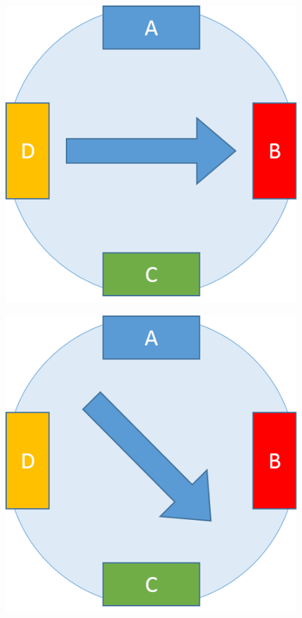 \documentclass[table,10pt,red]{beamer}	%
\begin{document}
\begin{frame}
\begin{minipage}[c]{0.24\textwidth}
\begin{figure}
		\end{figure}
	\end{minipage}
	\begin{minipage}[c]{0.24\textwidth}
		\begin{figure}
			\includegraphics[width=0.9\linewidth]{step3}
		\end{figure}
	\end{minipage}
	\begin{minipage}[c]{0.24\textwidth}
		\begin{figure}
			\includegraphics[width=0.9\linewidth]{step4}

\end{figure}
\end{minipage}
\end{frame}
\end{document}
